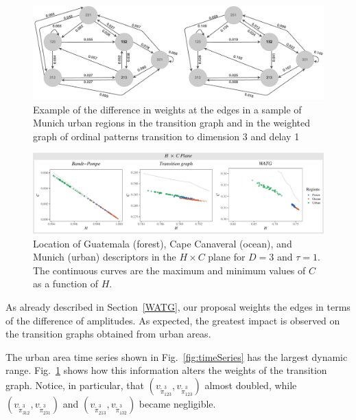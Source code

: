 \documentclass[journal]{IEEEtran}
\begin{document}
\begin{figure}[hbt]
	\includegraphics[width=2\columnwidth]{Figures/graphs.pdf}
	\caption{Example of the difference in weights at the edges in a sample of Munich urban regions in the transition graph and in the weighted graph of ordinal patterns
		transition to dimension 3 and delay 1}
	\label{fig:graphs}
\end{figure}

\begin{figure}[hbt]
	\includegraphics[width=2\columnwidth]{Figures/HCAnalysis.pdf}
	\caption{Location of Guatemala (forest), Cape Canaveral (ocean), and Munich (urban) descriptors in the $H \times C$ plane for $D=3$ and $\tau=1$. 
		The continuous curves are the maximum and minimum values of $C$ as a function of $H$.}
	\label{fig:plotsHC}
\end{figure}

As already described in Section~\ref{WATG}, our proposal weights the edges in terms of the difference of amplitudes.
As expected, the greatest impact is observed on the transition graphs obtained from urban areas.

The urban area time series shown in Fig.~\ref{fig:timeSeries} has the largest dynamic range.
Fig.~\ref{fig:graphs} shows how this information alters the weights of the transition graph.
Notice, in particular, that 
$(v_{\widetilde \pi^3_{123}}, v_{\widetilde \pi^3_{123}})$ almost doubled, while 
$(v_{\widetilde \pi^3_{312}}, v_{\widetilde \pi^3_{231}})$ and $(v_{\widetilde \pi^3_{213}}, v_{\widetilde \pi^3_{132}})$ became negligible.
\end{document}
